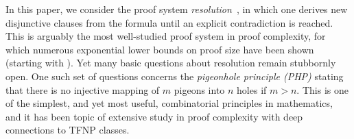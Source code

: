 \documentclass{theoretics}
\newcommand{\introduceterm}[1]{{\emph{#1}}}
\numberwithin{equation}{section}
\begin{document}
In this paper, we consider the proof system
\introduceterm{resolution}~\cite{Blake37Thesis}, in which one derives
new disjunctive clauses 
from the
formula until an
explicit contradiction is reached.
This is arguably the most well-studied proof system
in proof complexity, for which numerous exponential lower
bounds on proof size have been shown (starting with
\cite{CS88ManyHard,Haken85Intractability,Urquhart87HardExamples}).
Yet many basic questions about resolution remain stubbornly open.
One such set of questions concerns the
\introduceterm{pigeonhole principle (PHP)}
stating that there is no injective mapping of $m$ pigeons into $n$
holes if $m > n$.  This is one of the simplest, 
and yet most useful, combinatorial principles in mathematics, and it
has been topic of extensive study in proof complexity with deep
connections to TFNP classes.
\end{document}
